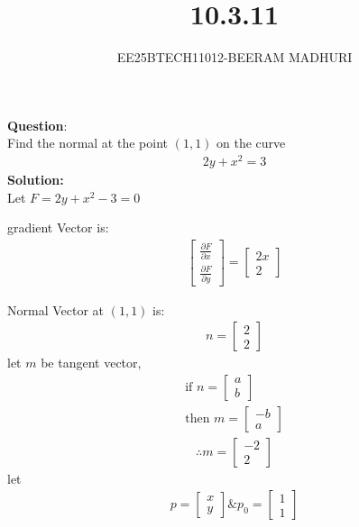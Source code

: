 \documentclass[journal]{IEEEtran}
\begin{document}

\vspace{3cm}

\title{10.3.11}
\author{EE25BTECH11012-BEERAM MADHURI}
{\let\newpage\relax\maketitle}

\renewcommand{\thefigure}{\theenumi}
\renewcommand{\thetable}{\theenumi}
\setlength{\intextsep}{10pt} %


\renewcommand{\thetable}{\theenumi}


\textbf{Question}:\\
Find the normal at the point $(1,1)$ on the curve
\begin{align}
2y + x^2 = 3
\end{align}
\textbf{Solution:}\\
Let $F = 2y + x^2 - 3 = 0$

gradient Vector is:
\begin{align}
\begin{bmatrix}
\frac{\partial F}{\partial x} \\
\frac{\partial F}{\partial y}
\end{bmatrix} = \begin{bmatrix}
2x \\
2
\end{bmatrix}
\end{align}

Normal Vector at $(1,1)$ is:
\begin{align}
n = \begin{bmatrix}
2 \\
2
\end{bmatrix}
\end{align}
let $m$ be tangent vector,
\begin{align}
\text{if } n = \begin{bmatrix}
a \\
b
\end{bmatrix}\\
\text{then } m = \begin{bmatrix}
-b \\
a
\end{bmatrix}
\end{align}
\begin{align}
\therefore m = \begin{bmatrix}
-2 \\
2
\end{bmatrix}
\end{align}
let 
\begin{align}
p = \begin{bmatrix}
x \\
y
\end{bmatrix} \& p_0 = \begin{bmatrix}
1 \\
1
\end{bmatrix}
\end{align}
\end{document}
